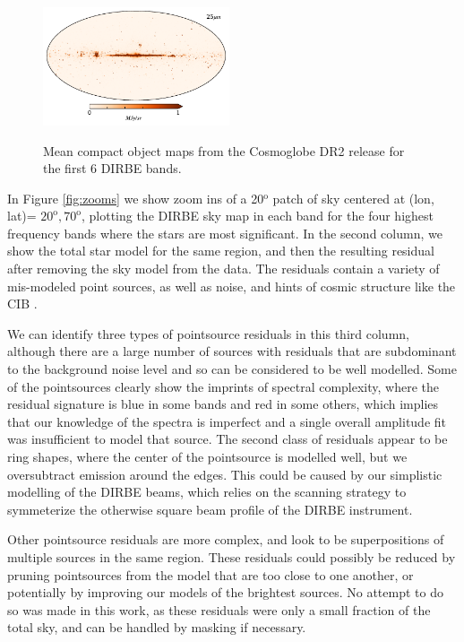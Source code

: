\documentclass{aa}
\begin{document}
\begin{figure}
  \includegraphics[width=0.49\textwidth]{figs/starmaps/all_stars_mean_06.pdf} \\
  \caption{Mean compact object maps from the Cosmoglobe DR2 release for the first 6 DIRBE bands. }
  \label{fig:starsT}
\end{figure}

In Figure \ref{fig:zooms} we show zoom ins of a 20$^\mathrm{o}$ patch of sky centered at (lon, lat)= $20^\mathrm{o}, 70^\mathrm{o}$, plotting the DIRBE sky map in each band for the four highest frequency bands where the stars are most significant. In the second column, we show the total star model for the same region, and then the resulting residual after removing the sky model from the data. The residuals contain a variety of mis-modeled point sources, as well as noise, and hints of cosmic structure like the CIB \citep{CG02_03}. 

We can identify three types of pointsource residuals in this third column, although there are a large number of sources with residuals that are subdominant to the background noise level and so can be considered to be well modelled. Some of the pointsources clearly show the imprints of spectral complexity, where the residual signature is blue in some bands and red in some others, which implies that our knowledge of the spectra is imperfect and a single overall amplitude fit was insufficient to model that source. The second class of residuals appear to be ring shapes, where the center of the pointsource is modelled well, but we oversubtract emission around the edges. This could be caused by our simplistic modelling of the DIRBE beams, which relies on the scanning strategy to symmeterize the otherwise square beam profile of the DIRBE instrument.

Other pointsource residuals are more complex, and look to be superpositions of multiple sources in the same region. These residuals could possibly be reduced by pruning pointsources from the model that are too close to one another, or potentially by improving our models of the brightest sources. No attempt to do so was made in this work, as these residuals were only a small fraction of the total sky, and can be handled by masking if necessary.
\end{document}
